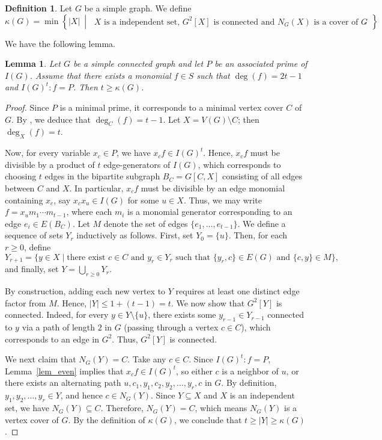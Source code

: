 \documentclass[12pt,reqno,twoside]{amsart}
\newtheorem{lem}[thm]{\bf Lemma}
\theoremstyle{definition}
\newtheorem{defn}[thm]{\bf Definition}
\theoremstyle{plain}
\theoremstyle{remark}
\numberwithin{equation}{section}
\begin{document}
\begin{defn} Let $G$ be a simple graph. We define 
\[
\kappa(G) = \min \left\{ |X| \ \middle|\ \begin{array}{l} X \text{ is a independent set, } G^2[X] \text{ is connected and } N_G(X) \text{ is a cover of } G\end{array} \right\}.
\]    
\end{defn}
We have the following lemma.

\begin{lem}\label{lem_kappa_1} 
Let $G$ be a simple connected graph and let $P$ be an associated prime of $I(G)$. Assume that there exists a monomial $f \in S$ such that $\deg(f) = 2t-1$ and $I(G)^t : f = P$. Then $t \ge \kappa(G)$.
\end{lem}

\begin{proof} 
Since $P$ is a minimal prime, it corresponds to a minimal vertex cover $C$ of $G$. By \cite[Lemma 2.1]{CHJV}, we deduce that $\deg_C(f) = t-1$. Let $X = V(G) \setminus C$; then $\deg_X(f) = t$. 

Now, for every variable $x_c \in P$, we have $x_c f \in I(G)^t$. Hence, $x_c f$ must be divisible by a product of $t$ edge-generators of $I(G)$, which corresponds to choosing $t$ edges in the bipartite subgraph $B_C = G[C,X]$ consisting of all edges between $C$ and $X$. In particular, $x_c f$ must be divisible by an edge monomial containing $x_c$, say $x_c x_u \in I(G)$ for some $u \in X$. Thus, we may write $f = x_u m_1 \cdots m_{t-1}$, where each $m_i$ is a monomial generator corresponding to an edge $e_i \in E(B_C)$. Let $M$ denote the set of edges $\{e_1, \ldots, e_{t-1}\}$. We define a sequence of sets $Y_r$ inductively as follows. First, set $Y_0 = \{u\}$. Then, for each $r \ge 0$, define
\[
Y_{r+1} = \{y \in X \mid \text{there exist } c \in C \text{ and } y_r \in Y_r \text{ such that } \{y_r,c\} \in E(G) \text{ and } \{c,y\} \in M\},
\]
and finally, set $Y = \bigcup_{r \ge 0} Y_r$. 

By construction, adding each new vertex to $Y$ requires at least one distinct edge factor from $M$. Hence, $|Y| \le 1 + (t-1) = t$. We now show that $G^2[Y]$ is connected. Indeed, for every $y \in Y \setminus \{u\}$, there exists some $y_{r-1} \in Y_{r-1}$ connected to $y$ via a path of length $2$ in $G$ (passing through a vertex $c \in C$), which corresponds to an edge in $G^2$. Thus, $G^2[Y]$ is connected.

We next claim that $N_G(Y) = C$. Take any $c \in C$. Since $I(G)^t : f = P$, Lemma~\ref{lem_even} implies that $x_c f \in I(G)^t$, so either $c$ is a neighbor of $u$, or there exists an alternating path $u, c_1, y_1, c_2, y_2, \ldots, y_r, c$ in $G$. By definition, $y_1, y_2, \ldots, y_r \in Y$, and hence $c \in N_G(Y)$. Since $Y \subseteq X$ and $X$ is an independent set, we have $N_G(Y) \subseteq C$. Therefore, $N_G(Y) = C$, which means $N_G(Y)$ is a vertex cover of $G$. By the definition of $\kappa(G)$, we conclude that $t \ge |Y| \ge \kappa(G)$.
\end{proof}
\end{document}
